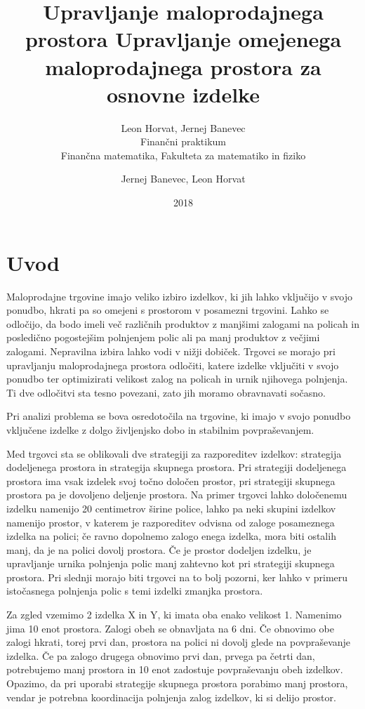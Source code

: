 \documentclass[a4paper]{article}
\title{Upravljanje maloprodajnega prostora}
\author{Leon Horvat, Jernej Banevec \\ Finančni praktikum \\ Finančna matematika, Fakulteta za matematiko in fiziko}
\date{2018}
\begin{document}
\title{%
  Upravljanje omejenega maloprodajnega prostora za osnovne izdelke}

\author{Jernej Banevec, Leon Horvat}

\maketitle

\pagebreak

\section{Uvod}


Maloprodajne trgovine imajo veliko izbiro izdelkov, ki jih lahko vključijo v svojo ponudbo, hkrati pa so omejeni s prostorom v posamezni trgovini. Lahko se odločijo, da bodo imeli več različnih produktov z manjšimi zalogami na policah in posledično pogostejšim polnjenjem polic ali pa manj produktov z večjimi zalogami. Nepravilna izbira lahko vodi v nižji dobiček. Trgovci se morajo pri upravljanju maloprodajnega prostora odločiti, katere izdelke vključiti v svojo ponudbo ter optimizirati velikost zalog na policah in urnik njihovega polnjenja. Ti dve odločitvi sta tesno povezani, zato jih moramo obravnavati sočasno. 


Pri analizi problema se bova osredotočila na trgovine, ki imajo v svojo ponudbo vključene izdelke z dolgo življenjsko dobo in stabilnim povpraševanjem. 

Med trgovci sta se oblikovali dve strategiji za razporeditev izdelkov: strategija dodeljenega prostora in strategija skupnega prostora. Pri strategiji dodeljenega prostora ima vsak izdelek svoj točno določen prostor, pri strategiji skupnega prostora pa je dovoljeno deljenje prostora. Na primer trgovci lahko določenemu izdelku namenijo 20 centimetrov širine police, lahko pa neki skupini izdelkov namenijo prostor, v katerem je razporeditev odvisna od zaloge posameznega izdelka na polici; če ravno dopolnemo zalogo enega izdelka, mora biti ostalih manj, da je na polici dovolj prostora. Če je prostor dodeljen izdelku, je upravljanje urnika polnjenja polic manj zahtevno kot pri strategiji skupnega prostora. Pri slednji morajo biti trgovci na to bolj pozorni, ker lahko v primeru istočasnega polnjenja polic s temi izdelki zmanjka prostora. 

\vspace{4 mm}


Za zgled vzemimo 2 izdelka X in Y, ki imata oba enako velikost 1. Namenimo jima 10 enot prostora. Zalogi obeh se obnavljata na 6 dni. Če obnovimo obe zalogi hkrati, torej prvi dan, prostora na polici ni dovolj glede na povpraševanje izdelka. Če pa zalogo drugega obnovimo prvi dan, prvega pa četrti dan, potrebujemo manj prostora in 10 enot zadostuje povpraševanju obeh izdelkov. Opazimo, da pri uporabi strategije skupnega prostora porabimo manj prostora, vendar je potrebna koordinacija polnjenja zalog izdelkov, ki si delijo prostor.
\end{document}
